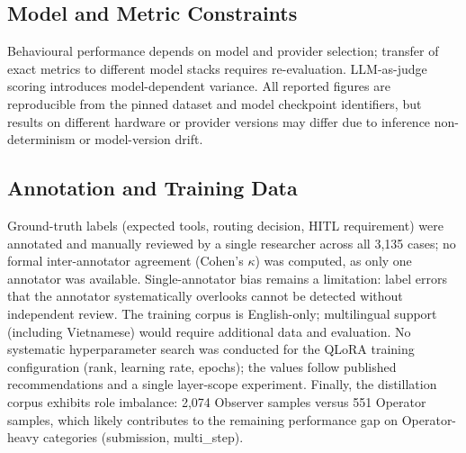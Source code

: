 \subsection{Model and Metric Constraints}

Behavioural performance depends on model and provider selection; transfer of exact metrics to different model stacks requires re-evaluation. LLM-as-judge scoring introduces model-dependent variance. All reported figures are reproducible from the pinned dataset and model checkpoint identifiers, but results on different hardware or provider versions may differ due to inference non-determinism or model-version drift.

\subsection{Annotation and Training Data}

Ground-truth labels (expected tools, routing decision, HITL requirement) were annotated and manually reviewed by a single researcher across all 3,135 cases; no formal inter-annotator agreement (Cohen's $\kappa$) was computed, as only one annotator was available. Single-annotator bias remains a limitation: label errors that the annotator systematically overlooks cannot be detected without independent review. The training corpus is English-only; multilingual support (including Vietnamese) would require additional data and evaluation. No systematic hyperparameter search was conducted for the QLoRA training configuration (rank, learning rate, epochs); the values follow published recommendations and a single layer-scope experiment. Finally, the distillation corpus exhibits role imbalance: 2,074 Observer samples versus 551 Operator samples, which likely contributes to the remaining performance gap on Operator-heavy categories (submission, multi\_step).
